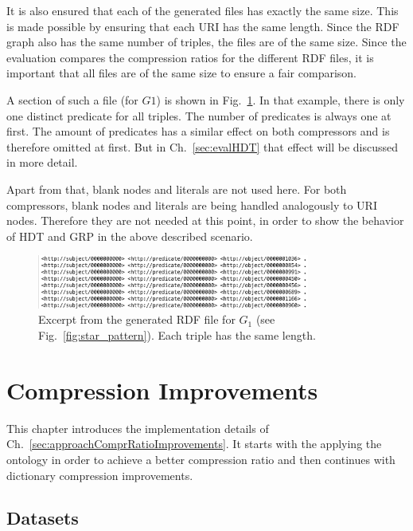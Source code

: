 It is also ensured that each of the generated files has exactly the same size. This is made possible by ensuring that each URI has the same length. Since the RDF graph also has the same number of triples, the files are of the same size. Since the evaluation compares the compression ratios for the different RDF files, it is important that all files are of the same size to ensure a fair comparison.

A section of such a file (for $G1$) is shown in Fig.~\ref{fig:rdfFile}. In that example, there is only one distinct predicate for all triples. The number of predicates is always one at first. The amount of predicates has a similar effect on both compressors and is therefore omitted at first. But in Ch.~\ref{sec:evalHDT} that effect will be discussed in more detail.

Apart from that, blank nodes and literals are not used here. For both compressors, blank nodes and literals are being handled analogously to URI nodes. Therefore they are not needed at this point, in order to show the behavior of HDT and GRP in the above described scenario.

\begin{figure}[h]
	\centering
	\includegraphics[width=0.8\textwidth]{figures/GRPvsHDT/file.png}
	\caption{Excerpt from the generated RDF file for $G_1$ (see Fig.~\ref{fig:star_pattern}). Each triple has the same length.}
	\label{fig:rdfFile}
\end{figure}

\section{Compression Improvements}\label{sec:implementationComprRatioImprovements}

This chapter introduces the implementation details of Ch.~\ref{sec:approachComprRatioImprovements}. It starts with the applying the ontology in order to achieve a better compression ratio and then continues with dictionary compression  improvements.

\subsection{Datasets}\label{sec:implementationDatasets}

